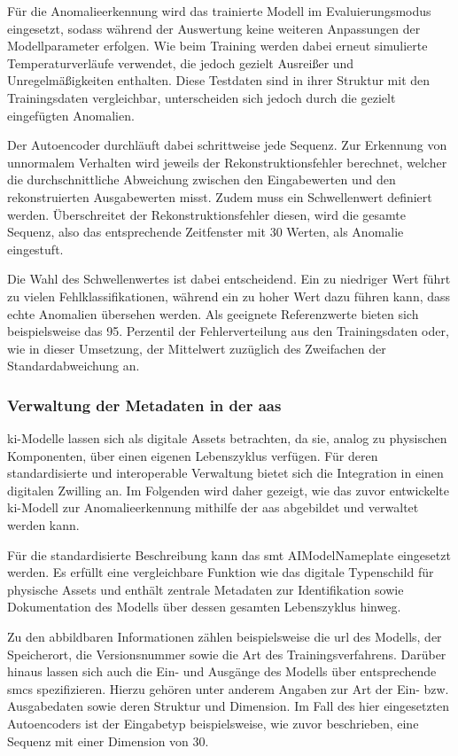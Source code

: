 Für die Anomalieerkennung wird das trainierte Modell im Evaluierungsmodus eingesetzt, sodass während der Auswertung keine weiteren Anpassungen der Modellparameter erfolgen.
Wie beim Training werden dabei erneut simulierte Temperaturverläufe verwendet, die jedoch gezielt Ausreißer und Unregelmäßigkeiten enthalten.
Diese Testdaten sind in ihrer Struktur mit den Trainingsdaten vergleichbar, unterscheiden sich jedoch durch die gezielt eingefügten Anomalien.

Der Autoencoder durchläuft dabei schrittweise jede Sequenz. 
Zur Erkennung von unnormalem Verhalten wird jeweils der Rekonstruktionsfehler berechnet, welcher die durchschnittliche Abweichung zwischen den Eingabewerten und den rekonstruierten Ausgabewerten misst.
Zudem muss ein Schwellenwert definiert werden.
Überschreitet der Rekonstruktionsfehler diesen, wird die gesamte Sequenz, also das entsprechende Zeitfenster mit 30 Werten, als Anomalie eingestuft.

Die Wahl des Schwellenwertes ist dabei entscheidend.
Ein zu niedriger Wert führt zu vielen Fehlklassifikationen, während ein zu hoher Wert dazu führen kann, dass echte Anomalien übersehen werden.
Als geeignete Referenzwerte bieten sich beispielsweise das 95. Perzentil der Fehlerverteilung aus den Trainingsdaten oder, wie in dieser Umsetzung,  der Mittelwert zuzüglich des Zweifachen der Standardabweichung an.

\subsubsection{Verwaltung der Metadaten in der \acs{aas}}
\acs{ki}-Modelle lassen sich als digitale Assets betrachten, da sie, analog zu physischen Komponenten, über einen eigenen Lebenszyklus verfügen.  
Für deren standardisierte und interoperable Verwaltung bietet sich die Integration in einen digitalen Zwilling an.  
Im Folgenden wird daher gezeigt, wie das zuvor entwickelte \acs{ki}-Modell zur Anomalieerkennung mithilfe der \acs{aas} abgebildet und verwaltet werden kann.

Für die standardisierte Beschreibung kann das \acs{smt} AIModelNameplate \cite{SpezifikationAIModelNameplate} eingesetzt werden. 
Es erfüllt eine vergleichbare Funktion wie das digitale Typenschild für physische Assets und enthält zentrale Metadaten zur Identifikation sowie Dokumentation des Modells über dessen gesamten Lebenszyklus hinweg.

Zu den abbildbaren Informationen zählen beispielsweise die \acs{url} des Modells, der Speicherort, die Versionsnummer sowie die Art des Trainingsverfahrens. 
Darüber hinaus lassen sich auch die Ein- und Ausgänge des Modells über entsprechende \acsp{smc} spezifizieren. 
Hierzu gehören unter anderem Angaben zur Art der Ein- bzw. Ausgabedaten sowie deren Struktur und Dimension. 
Im Fall des hier eingesetzten Autoencoders ist der Eingabetyp beispielsweise, wie zuvor beschrieben, eine Sequenz mit einer Dimension von 30.

